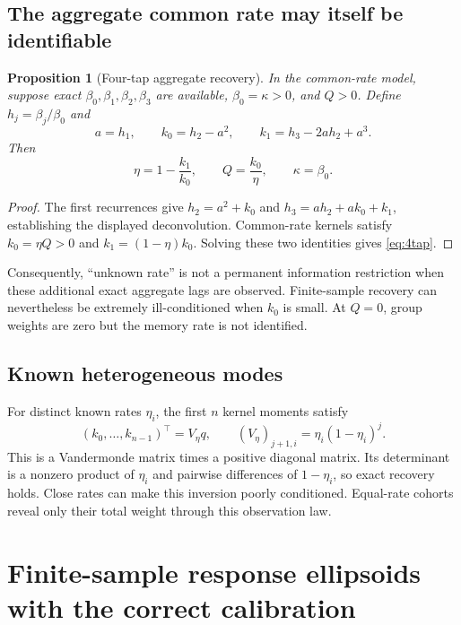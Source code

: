 \documentclass[11pt,a4paper]{article}
\newtheorem{proposition}[theorem]{Proposition}
\theoremstyle{definition}\newtheorem{definition}[theorem]{Definition}
\theoremstyle{remark}\newtheorem{remark}[theorem]{Remark}
\begin{document}
\subsection{The aggregate common rate may itself be identifiable}
\begin{proposition}[Four-tap aggregate recovery]\label{prop:4tap}
In the common-rate model, suppose exact $\beta_0,\beta_1,\beta_2,\beta_3$ are available, $\beta_0=\kappa>0$, and $Q>0$. Define $h_j=\beta_j/\beta_0$ and
\[
 a=h_1,\qquad k_0=h_2-a^2,\qquad
 k_1=h_3-2ah_2+a^3.
\]
Then
\begin{equation}
 \eta=1-\frac{k_1}{k_0},\qquad Q=\frac{k_0}{\eta},\qquad\kappa=\beta_0.
 \label{eq:4tap}
\end{equation}
\end{proposition}
\begin{proof}
The first recurrences give $h_2=a^2+k_0$ and
$h_3=ah_2+ak_0+k_1$, establishing the displayed deconvolution. Common-rate kernels satisfy $k_0=\eta Q>0$ and $k_1=(1-\eta)k_0$. Solving these two identities gives \eqref{eq:4tap}.
\end{proof}
Consequently, ``unknown rate'' is not a permanent information restriction when these additional exact aggregate lags are observed. Finite-sample recovery can nevertheless be extremely ill-conditioned when $k_0$ is small. At $Q=0$, group weights are zero but the memory rate is not identified.

\subsection{Known heterogeneous modes}
For distinct known rates $\eta_i$, the first $n$ kernel moments satisfy
\[
 (k_0,\ldots,k_{n-1})^\top=V_\eta q,\qquad
 (V_\eta)_{j+1,i}=\eta_i(1-\eta_i)^j.
\]
This is a Vandermonde matrix times a positive diagonal matrix. Its determinant is a nonzero product of $\eta_i$ and pairwise differences of $1-\eta_i$, so exact recovery holds. Close rates can make this inversion poorly conditioned. Equal-rate cohorts reveal only their total weight through this observation law.

\section{Finite-sample response ellipsoids with the correct calibration}
\end{document}
